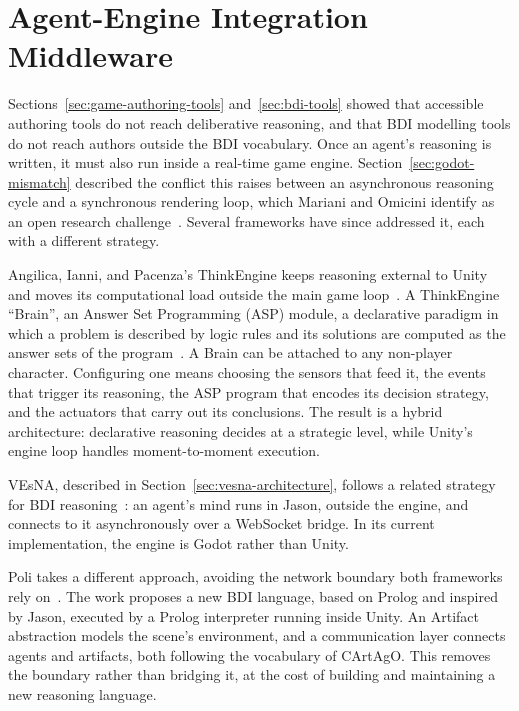  
\section{Agent-Engine Integration Middleware}
\label{sec:agent-engine-integration}
 
 
Sections~\ref{sec:game-authoring-tools} and~\ref{sec:bdi-tools} showed that accessible authoring tools do not reach deliberative reasoning, and that BDI modelling tools do not reach authors outside the BDI vocabulary. Once an agent's reasoning is written, it must also run inside a real-time game engine. Section~\ref{sec:godot-mismatch} described the conflict this raises between an asynchronous reasoning cycle and a synchronous rendering loop, which Mariani and Omicini identify as an open research challenge~\cite{Mariani2016}. Several frameworks have since addressed it, each with a different strategy.
 
Angilica, Ianni, and Pacenza's ThinkEngine keeps reasoning external to Unity and moves its computational load outside the main game loop~\cite{Angilica2022}. A ThinkEngine ``Brain'', an Answer Set Programming (ASP) module, a declarative paradigm in which a problem is described by logic rules and its solutions are computed as the answer sets of the program~\cite{Brewka2011}. A Brain can be attached to any non-player character. Configuring one means choosing the sensors that feed it, the events that trigger its reasoning, the ASP program that encodes its decision strategy, and the actuators that carry out its conclusions. The result is a hybrid architecture: declarative reasoning decides at a strategic level, while Unity's engine loop handles moment-to-moment execution.
 
VEsNA, described in Section~\ref{sec:vesna-architecture}, follows a related strategy for BDI reasoning~\cite{Gatti2026}: an agent's mind runs in Jason, outside the engine, and connects to it asynchronously over a WebSocket bridge. In its current implementation, the engine is Godot rather than Unity.
 
Poli takes a different approach, avoiding the network boundary both frameworks rely on~\cite{Poli2018}. The work proposes a new BDI language, based on Prolog and inspired by Jason, executed by a Prolog interpreter running inside Unity. An Artifact abstraction models the scene's environment, and a communication layer connects agents and artifacts, both following the vocabulary of CArtAgO. This removes the boundary rather than bridging it, at the cost of building and maintaining a new reasoning language.
 
